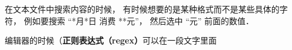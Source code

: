 

在文本文件中搜索内容的时候， 有时候想要的是某种格式而不是某些具体的字符， 例如要搜索 “*月*日 消费 **元”， 然后选中 “元” 前面的数值．

编辑器的时候（\textbf{正则表达式（regex）}可以在一段文字里面
